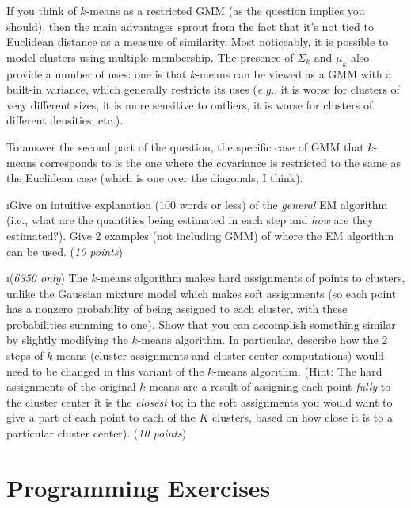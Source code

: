 \documentclass[fleqn]{article}
\begin{document}
\begin{solution}
If you think of $k$-means as a restricted GMM (as the question implies you should), then the main advantages sprout from the fact that it's not tied to Euclidean distance as a measure of similarity. Most noticeably, it is possible to model clusters using multiple membership. The presence of $\Sigma_k$ and $\mu_k$ also provide a number of uses: one is that $k$-means can be viewed as a GMM with a built-in variance, which generally restricts its uses (\textit{e.g.}, it is worse for clusters of very different sizes, it is more sensitive to outliers, it is worse for clusters of different densities, etc.).

To answer the second part of the question, the specific case of GMM that $k$-means corresponds to is the one where the covariance is restricted to the same as the Euclidean case (which is one over the diagonals, I think).
\end{solution}

\i Give an intuitive explanation  (100 words or less) of the \textit{general} 
EM algorithm (i.e., what are the quantities being estimated in each step and 
\textit{how} are they estimated?). Give 2 examples (not including GMM) of where the 
EM algorithm can be used. (\textit{10 points}) 

\i (\textit{6350 only}) The $k$-means algorithm makes hard assignments of 
points to clusters, unlike the Gaussian mixture model which makes soft assignments
(so each point has a nonzero probability of being assigned to each cluster, 
with these probabilities summing to one). Show that you can accomplish something 
similar by slightly modifying the $k$-means algorithm. In particular, describe how 
the 2 steps of $k$-means (cluster assignments and cluster center computations) would 
need to be changed in this variant of the $k$-means algorithm. (Hint: The hard 
assignments of the original $k$-means are a result of assigning each point 
\textit{fully} to the cluster center it is the \textit{closest} to; in the soft 
assignments you would  want to give a part of each point to each of the $K$ clusters, 
based on how close it is to a particular cluster center). (\textit{10 points})

\ene

\section{Programming Exercises}

\bee
\end{document}
